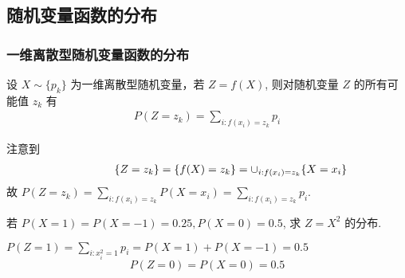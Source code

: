 
 \subsection{随机变量函数的分布}
 \begin{frame}
 	\frametitle{一维离散型随机变量函数的分布}
 	\begin{thm}
 		设 $X\sim \{p_k\}$ 为一维离散型随机变量，若 $Z=f (X)$, 则对随机变量 $Z$ 的所有可能值 $z_k$ 有
 		\begin{eqnarray*}
 			P(Z=z_k)=\sum_{i:f(x_i)=z_k}p_i
 		\end{eqnarray*}
 	\end{thm}%
 	\pause%
 	\noindent\zheng 注意到 \vspace{-1cm}
 	\begin{eqnarray*}
 		\hspace{1.5cm} \{Z=z_k\}=\{f(X)=z_k\}=\cup_{i:f(x_i)=z_k}\{X=x_i\}
 	\end{eqnarray*}
 	\pause 故 $P (Z=z_k)=\sum_{i:f (x_i)=z_k} P (X=x_i)=\sum_{i:f (x_i)=z_k} p_i$.
 	\begin{exam}
 		若 $P (X=1)=P (X=-1)=0.25, P (X=0)=0.5$, 求 $Z=X^2$ 的分布.
 	\end{exam}

 	\jieda \pause$P(Z=1)=\sum_{i:x_i^2=1}p_i=P(X=1)+P(X=-1)=0.5$\\
 	\pause $$P(Z=0)=P(X=0)=0.5$$
 \end{frame}

